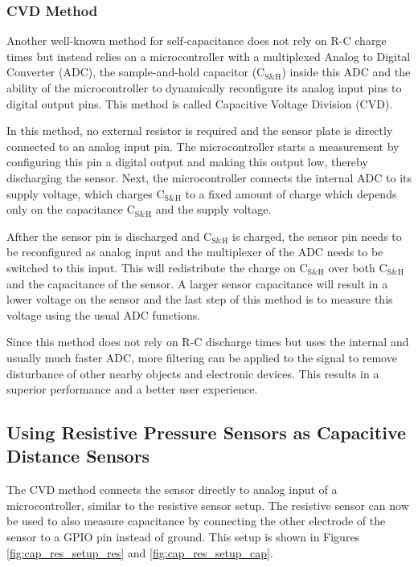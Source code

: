 \documentclass{sigchi-ext}
\begin{document}
\subsubsection{CVD Method}
Another well-known method for self-capacitance does not rely on R-C charge times
but instead relies on a microcontroller with a multiplexed Analog to Digital
Converter (ADC), the sample-and-hold capacitor ($\textrm{C}_{\textrm{S\&H}}$)
inside this ADC and the ability of the microcontroller to dynamically
reconfigure its analog input pins to digital output pins. This method is called
Capacitive Voltage Division (CVD).

In this method, no external resistor is required and the sensor plate is
directly connected to an analog input pin. The microcontroller starts a
measurement by configuring this pin a digital output and making this output low,
thereby discharging the sensor. Next, the microcontroller connects the internal
ADC to its supply voltage, which charges $\textrm{C}_{\textrm{S\&H}}$ to a fixed
amount of charge which depends only on the capacitance
$\textrm{C}_{\textrm{S\&H}}$ and the supply voltage.

Afther the sensor pin is discharged and $\textrm{C}_{\textrm{S\&H}}$ is
charged, the sensor pin needs to be reconfigured as analog input and the
multiplexer of the ADC needs to be switched to this input. This will
redistribute the charge on $\textrm{C}_{\textrm{S\&H}}$ over both
$\textrm{C}_{\textrm{S\&H}}$ and the capacitance of the sensor. A larger sensor
capacitance will result in a lower voltage on the sensor and the last step of
this method is to measure this voltage using the usual ADC functions.

Since this method does not rely on R-C discharge times but uses the internal and
usually much faster ADC, more filtering can be applied to the signal to remove
disturbance of other nearby objects and electronic devices. This results in a
superior performance and a better user experience.

\subsection{Using Resistive Pressure Sensors as Capacitive Distance Sensors}
The CVD method connects the sensor directly to analog input of a
microcontroller, similar to the resistive sensor setup. The resistive sensor can
now be used to also measure capacitance by connecting the other electrode of the
sensor to a GPIO pin instead of ground. This setup is shown in Figures
\ref{fig:cap_res_setup_res} and \ref{fig:cap_res_setup_cap}.
\end{document}
